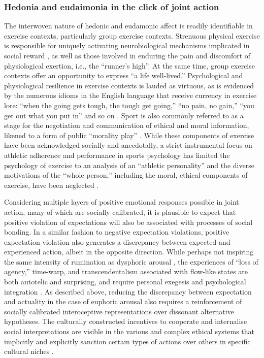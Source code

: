 \begin{CJK}{UTF8}{gbsn}
{\subsubsection{Hedonia and eudaimonia in the click of joint action}
  The interwoven nature of hedonic and eudamonic affect is readily identifiable in exercise contexts, particularly group exercise contexts.  Strenuous physical exercise is responsible for uniquely activating neurobiological mechanisms implicated in social reward \citep{Dunbar2010,Eisenberger2012}, as well as those involved in enduring the pain and discomfort of physiological exertion, i.e., the ``runner’s high''\citep{Boecker2008,Dietrich2004,Sullivan2014,Tarr2015}. At the same time, group exercise contexts offer an opportunity to express ``a life well-lived.''  Psychological and physiological resilience in exercise contexts is lauded as virtuous, as is evidenced by the numerous idioms in the English language that receive currency in exercise lore: ``when the going gets tough, the tough get going,'' ``no pain, no gain,'' ``you get out what you put in'' and so on \citep{Sarkar2014}.  Sport is also commonly referred to as a stage for the negotiation and communication of ethical and moral information, likened to a form of public ``morality play'' \citep{McNamee2008}.  While these components of exercise have been acknowledged socially and anecdotally, a strict instrumental focus on athletic adherence and performance in sports psychology has limited the psychology of exercise to an analysis of an ``athletic personality'' and the diverse motivations of the ``whole person,'' including the moral, ethical components of exercise, have been neglected \citep{Beedie2015,Coulter2015,Laborde2014}.

Considering multiple layers of positive emotional responses possible in joint action, many of which are socially calibrated, it is plausible to expect that positive violation of expectations will also be associated with processes of social bonding.  In a similar fashion to negative expectation violations, positive expectation violation also generates a discrepancy between expected and experienced action, albeit in the opposite direction.  While perhaps not inspiring the same intensity of rumination as dysphoric arousal \citep{Russell2014}, the experiences of ``loss of agency,'' time-warp, and transcendentalism associated with flow-like states are both autotelic and surprising, and require personal exegesis and psychological integration \citep{Jackson1995,Whitehouse2004}.  As described above, reducing the discrepancy between expectation and actuality in the case of euphoric arousal also requires a reinforcement of socially calibrated interoceptive representations over dissonant alternative hypotheses.   The culturally constructed incentives to cooperate and internalise social interpretations are visible in the various and complex ethical systems that implicitly and explicitly sanction certain types of actions over others in specific cultural niches \citep{Slingerland2014}.



}
\end{CJK}
